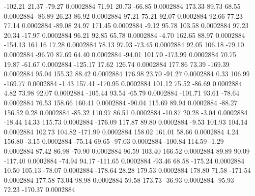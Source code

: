      -102.21       21.37      -79.27     0.0002884
       71.91       20.73      -66.85     0.0002884
      173.33       89.73       68.55     0.0002884
      -86.89       26.23       86.92     0.0002884
       97.21       75.21       92.07     0.0002884
       92.66       77.23       77.14     0.0002884
      -89.08       24.97      171.45     0.0002884
       -9.12       95.78      103.58     0.0002884
       97.23       20.34      -17.97     0.0002884
       96.21       92.85       65.78     0.0002884
       -4.70      162.65       88.97     0.0002884
     -154.13      161.16       17.28     0.0002884
       78.13       97.93      -73.45     0.0002884
       92.05      106.18      -79.10     0.0002884
      -96.70       87.69       64.40     0.0002884
      -94.01      101.70     -173.99     0.0002884
       70.75       19.87      -61.67     0.0002884
     -125.17       17.62      126.74     0.0002884
      177.86       73.39     -169.39     0.0002884
       95.04      155.32       88.42     0.0002884
      176.98       23.70      -91.27     0.0002884
        0.33      106.99     -169.77     0.0002884
       -1.43      157.41     -170.95     0.0002884
      101.12       75.52      -86.69     0.0002884
        4.82       73.98       92.07     0.0002884
     -105.44       93.54      -65.79     0.0002884
     -101.71       93.61      -78.64     0.0002884
       76.53      158.66      160.41     0.0002884
      -90.04      115.69       89.94     0.0002884
      -88.27      156.52        0.28     0.0002884
      -85.32      110.97       86.51     0.0002884
      -10.87       20.28       -3.04     0.0002884
      -18.44       14.33      115.73     0.0002884
     -176.09      117.87       89.80     0.0002884
       -9.53      101.93      104.14     0.0002884
      102.73      104.82     -171.99     0.0002884
      158.02      161.01       58.66     0.0002884
        4.24      156.80       -3.15     0.0002884
      -75.14       69.65      -97.03     0.0002884
     -100.84      114.59       -1.29     0.0002884
       87.42       86.98      -70.90     0.0002884
       96.59      103.40      166.52     0.0002884
       89.89       90.09     -117.40     0.0002884
      -74.94       94.17     -111.65     0.0002884
      -93.46       68.58     -175.24     0.0002884
       10.50      105.13      -78.07     0.0002884
     -178.64       28.28      179.53     0.0002884
      178.80       71.58     -171.54     0.0002884
      177.58       73.04       98.98     0.0002884
       59.58      173.73      -36.93     0.0002884
      -95.93       72.23     -170.37     0.0002884
